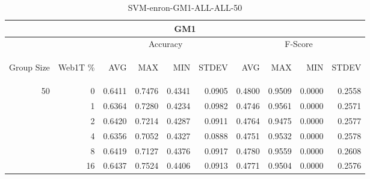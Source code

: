 \begin{center}
\begin{table}[htbp] 
 \begin{center}
\begin{tabular}{ | r | r | r | r | r | r | r | r | r | r |}
\hline
\multicolumn{10}{|c|}{GM1}\\
\hline
 & & \multicolumn{4}{|c|}{Accuracy} & \multicolumn{4}{|c|}{F-Score}\\ \cline{3-10}
\begin{sideways}Group Size\end{sideways} & \begin{sideways}Web1T \%\end{sideways} & \begin{sideways}AVG\end{sideways} & \begin{sideways}MAX\end{sideways} & \begin{sideways}MIN\end{sideways} & \begin{sideways}STDEV\end{sideways} & \begin{sideways}AVG\end{sideways} & \begin{sideways}MAX\end{sideways} & \begin{sideways}MIN\end{sideways} & \begin{sideways}STDEV\end{sideways}\\
\hline
\multirow{5}{*}{50}
 & 0 & 0.6411 & 0.7476 & 0.4341 & 0.0905 & 0.4800 & 0.9509 & 0.0000 & 0.2558\\ \cline{2-10}
 & 1 & 0.6364 & 0.7280 & 0.4234 & 0.0982 & 0.4746 & 0.9561 & 0.0000 & 0.2571\\ \cline{2-10}
 & 2 & 0.6420 & 0.7214 & 0.4287 & 0.0911 & 0.4764 & 0.9475 & 0.0000 & 0.2577\\ \cline{2-10}
 & 4 & 0.6356 & 0.7052 & 0.4327 & 0.0888 & 0.4751 & 0.9532 & 0.0000 & 0.2578\\ \cline{2-10}
 & 8 & 0.6419 & 0.7127 & 0.4376 & 0.0917 & 0.4780 & 0.9559 & 0.0000 & 0.2608\\ \cline{2-10}
 & 16 & 0.6437 & 0.7524 & 0.4406 & 0.0913 & 0.4771 & 0.9504 & 0.0000 & 0.2576\\ \cline{2-10}
\hline
\end{tabular}
\caption{SVM-enron-GM1-ALL-ALL-50}
\label{table:SVM-enron-GM1-ALL-ALL-50}
\end{center}
 \end{table}
\end{center}

